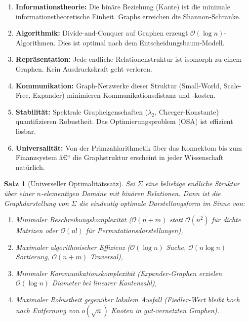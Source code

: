 ﻿\documentclass[12pt,a4paper,twoside]{article}
\theoremstyle{definition}
\theoremstyle{plain}
\newtheorem{theorem}{Satz}[section]
\theoremstyle{remark}
\begin{document}
\begin{enumerate}[label=\textbf{P\arabic*.}]
  \item \textbf{Informationstheorie:} Die binäre Beziehung
        (Kante) ist die minimale informationstheoretische Einheit.
        Graphs erreichen die Shannon-Schranke.
  \item \textbf{Algorithmik:} Divide-and-Conquer auf Graphen
        erzeugt $\mathcal{O}(\log n)$-Algorithmen.  Dies ist
        optimal nach dem Entscheidungsbaum-Modell.
  \item \textbf{Repräsentation:} Jede endliche Relationenstruktur
        ist isomorph zu einem Graphen.  Kein Ausdruckskraft geht
        verloren.
  \item \textbf{Kommunikation:} Graph-Netzwerke dieser Struktur
        (Small-World, Scale-Free, Expander) minimieren
        Kommunikationsdistanz und -kosten.
  \item \textbf{Stabilität:} Spektrale Grapheigenschaften
        ($\lambda_2$, Cheeger-Konstante) quantifizieren Robustheit.
        Das Optimierungsproblem (OSA) ist effizient lösbar.
  \item \textbf{Universalität:} Von der Primzahlarithmetik
        über das Konnektom bis zum Finanzsystem â€“ die
        Graphstruktur erscheint in jeder Wissenschaft natürlich.
\end{enumerate}

\begin{theorem}[Universeller Optimalitätssatz]
\label{thm:haupt}
Sei $\Sigma$ eine beliebige endliche Struktur über einer
$n$-elementigen Domäne mit binären Relationen.  Dann ist
die Graphdarstellung von $\Sigma$ die eindeutig optimale
Darstellungsform im Sinne von:
\begin{enumerate}[label=(\roman*)]
  \item Minimaler Beschreibungskomplexität
        ($\mathcal{O}(n + m)$ statt $\mathcal{O}(n^2)$
         für dichte Matrizen oder $\mathcal{O}(n!)$ für
         Permutationsdarstellungen),
  \item Maximaler algorithmischer Effizienz
        ($\mathcal{O}(\log n)$ Suche, $\mathcal{O}(n \log n)$
         Sortierung, $\mathcal{O}(n + m)$ Traversal),
  \item Minimaler Kommunikationskomplexität
        (Expander-Graphen erzielen $\mathcal{O}(\log n)$
         Diameter bei linearer Kantenzahl),
  \item Maximaler Robustheit gegenüber lokalem Ausfall
        (Fiedler-Wert bleibt hoch nach Entfernung von $o(\sqrt{n})$
         Knoten in gut-vernetzten Graphen).
\end{enumerate}
\end{theorem}
\end{document}
